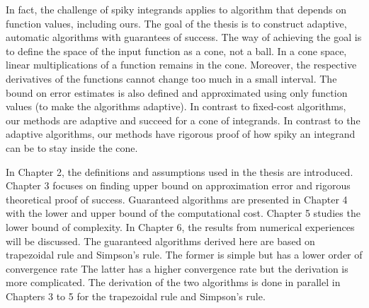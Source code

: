 \documentclass{iitthesis}
\theoremstyle{definition}
\theoremstyle{remark}
\begin{document}
In fact, the challenge of spiky integrands applies to algorithm that depends on function values, including ours. The goal of the thesis is to construct adaptive, automatic algorithms with guarantees of success. The way of achieving the goal is to define the space of the input function as a cone, not a ball. In a cone space, linear multiplications of a function remains in the cone. Moreover, the respective derivatives of the functions cannot change too much in a small interval. The bound on error estimates is also defined and approximated using only function values (to make the algorithms adaptive). In contrast to fixed-cost algorithms, our methods are adaptive and succeed for a cone of integrands. In contrast to the adaptive algorithms, our methods have rigorous proof of how spiky an integrand can be to stay inside the cone.







In Chapter 2, the definitions and assumptions used in the thesis are introduced. Chapter 3 focuses on finding upper bound on approximation error and rigorous theoretical proof of success. Guaranteed algorithms are presented in Chapter 4 with the lower and upper bound of the computational cost. Chapter 5 studies the lower bound of complexity. In Chapter 6, the results from numerical experiences will be discussed.  The guaranteed algorithms derived here are based on trapezoidal rule and Simpson's rule. The former is simple but has a lower order of convergence rate The latter has a higher convergence rate but the derivation is more complicated. The derivation of the two algorithms is done in parallel in Chapters 3 to 5 for the trapezoidal rule and Simpson's rule.

\clearpage



\end{document}
